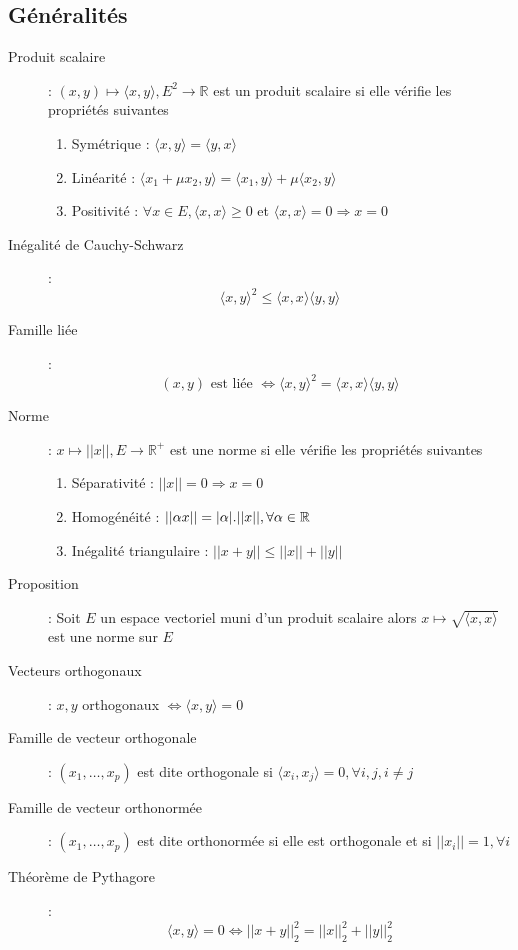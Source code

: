 \subsection{Généralités}
\begin{description}
\item[Produit scalaire] : $(x,y)\mapsto\langle x,y \rangle, E^2\rightarrow\mathbb R$ est un produit scalaire si elle vérifie les propriétés suivantes
    \begin{enumerate}
        \item Symétrique : $\langle x,y\rangle=\langle y,x\rangle$
        \item Linéarité : $\langle x_1+\mu x_2, y\rangle=\langle x_1,y\rangle + \mu\langle x_2,y\rangle$
        \item Positivité : $\forall x\in E, \langle x,x\rangle\ge 0$ et $\langle x,x \rangle=0\Rightarrow x=0$
    \end{enumerate}
\item[Inégalité de Cauchy-Schwarz] :
    \[ \langle x,y\rangle^2\le \langle x,x\rangle \langle y,y\rangle \]
\item[Famille liée] :
    \[ (x,y)\textrm{ est liée }\Leftrightarrow\langle x,y\rangle^2=\langle x,x\rangle \langle y,y\rangle \]
\item[Norme] : $x\mapsto ||x||,E\rightarrow\mathbb R^+$ est une norme si elle vérifie les propriétés suivantes
    \begin{enumerate}
        \item Séparativité : $||x||=0\Rightarrow x=0$
        \item Homogénéité : $||\alpha x||=|\alpha|.||x||, \forall\alpha\in\mathbb{R}$
        \item Inégalité triangulaire : $||x+y||\le ||x||+||y||$
    \end{enumerate}
\item[Proposition] : Soit $E$ un espace vectoriel muni d'un produit scalaire alors $x\mapsto\sqrt{\langle x,x\rangle}$ est une norme sur $E$
\item[Vecteurs orthogonaux] : $x,y$ orthogonaux $\Leftrightarrow\langle x,y\rangle = 0$
\item[Famille de vecteur orthogonale] : $(x_1,\dots, x_p)$ est dite orthogonale si $\langle x_i,x_j\rangle =0, \forall i,j, i\ne j$
\item[Famille de vecteur orthonormée] : $(x_1,\dots, x_p)$ est dite orthonormée si elle est orthogonale et si $||x_i||=1, \forall i$
\item[Théorème de Pythagore] : \[ \langle x,y\rangle =0\Leftrightarrow ||x+y||_2^2=||x||_2^2+||y||_2^2 \]

\end{description}
